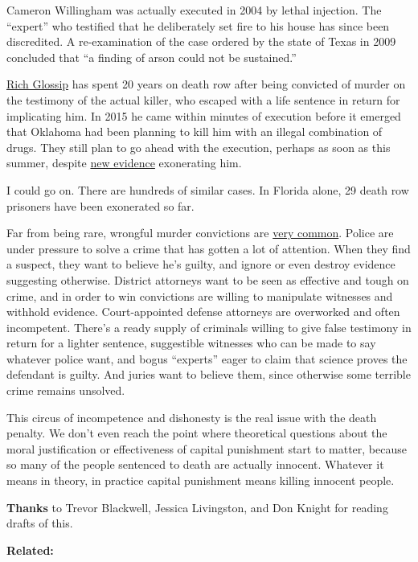Cameron Willingham was actually executed in 2004 by lethal injection.
The ``expert'' who testified that he deliberately set fire to his house
has since been discredited. A re-examination of the case ordered by the
state of Texas in 2009 concluded that ``a finding of arson could not be
sustained.''

\href{https://saverichardglossip.com/facts}{Rich Glossip} has spent 20
years on death row after being convicted of murder on the testimony of
the actual killer, who escaped with a life sentence in return for
implicating him. In 2015 he came within minutes of execution before it
emerged that Oklahoma had been planning to kill him with an illegal
combination of drugs. They still plan to go ahead with the execution,
perhaps as soon as this summer, despite
\href{https://www.usnews.com/news/best-states/oklahoma/articles/2020-10-14/attorney-for-oklahoma-death-row-inmate-claims-new-evidence}{new
evidence} exonerating him.

I could go on. There are hundreds of similar cases. In Florida alone, 29
death row prisoners have been exonerated so far.

Far from being rare, wrongful murder convictions are
\href{https://deathpenaltyinfo.org/policy-issues/innocence/description-of-innocence-cases}{very
common}. Police are under pressure to solve a crime that has gotten a
lot of attention. When they find a suspect, they want to believe he's
guilty, and ignore or even destroy evidence suggesting otherwise.
District attorneys want to be seen as effective and tough on crime, and
in order to win convictions are willing to manipulate witnesses and
withhold evidence. Court-appointed defense attorneys are overworked and
often incompetent. There's a ready supply of criminals willing to give
false testimony in return for a lighter sentence, suggestible witnesses
who can be made to say whatever police want, and bogus ``experts'' eager
to claim that science proves the defendant is guilty. And juries want to
believe them, since otherwise some terrible crime remains unsolved.

This circus of incompetence and dishonesty is the real issue with the
death penalty. We don't even reach the point where theoretical questions
about the moral justification or effectiveness of capital punishment
start to matter, because so many of the people sentenced to death are
actually innocent. Whatever it means in theory, in practice capital
punishment means killing innocent people.

\textbf{Thanks} to Trevor Blackwell, Jessica Livingston, and Don Knight
for reading drafts of this.

\textbf{Related:}
